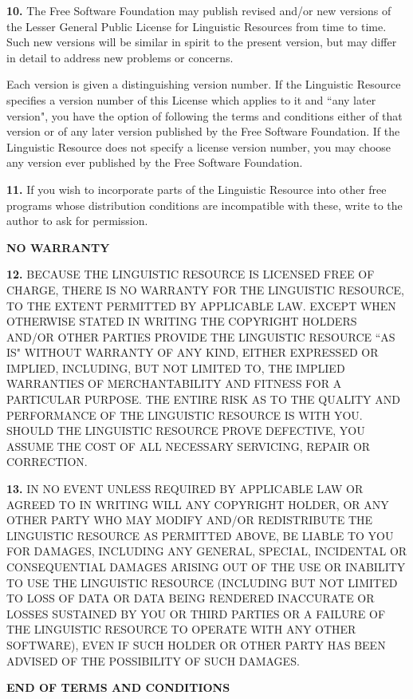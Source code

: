 \documentclass[10pt]{article}
\begin{document}
\vspace{5pt}\noindent
{\bf 10.} The Free Software 
      Foundation may publish revised and/or new versions of the Lesser General 
      Public License for Linguistic Resources from time to time. Such new 
      versions will be similar in spirit to the present version, but may differ 
      in detail to address new problems or concerns.

\vspace{5pt}\noindent
Each 
      version is given a distinguishing version number. If the Linguistic 
      Resource specifies a version number of this License which applies to it 
      and ``any later version", you have the option of following the terms and 
      conditions either of that version or of any later version published by the 
      Free Software Foundation. If the Linguistic Resource does not specify a 
      license version number, you may choose any version ever published by the 
      Free Software Foundation. 

\vspace{5pt}\noindent
{\bf 11.} If you wish to incorporate 
      parts of the Linguistic Resource into other free programs whose 
      distribution conditions are incompatible with these, write to the author 
      to ask for permission. 
\begin{center}{\bf NO WARRANTY}\end{center}
 
\vspace{5pt}\noindent
{\bf 12.} BECAUSE THE LINGUISTIC 
      RESOURCE IS LICENSED FREE OF CHARGE, THERE IS NO WARRANTY FOR THE LINGUISTIC RESOURCE, TO THE EXTENT PERMITTED BY APPLICABLE LAW. EXCEPT WHEN OTHERWISE STATED IN WRITING THE COPYRIGHT HOLDERS AND/OR OTHER PARTIES PROVIDE THE LINGUISTIC RESOURCE ``AS IS" WITHOUT WARRANTY OF ANY KIND, EITHER EXPRESSED OR IMPLIED, INCLUDING, BUT NOT LIMITED TO, THE IMPLIED WARRANTIES OF MERCHANTABILITY AND FITNESS FOR A PARTICULAR PURPOSE. THE ENTIRE RISK AS TO THE QUALITY AND PERFORMANCE OF THE LINGUISTIC RESOURCE IS WITH YOU. SHOULD THE LINGUISTIC RESOURCE PROVE DEFECTIVE, YOU ASSUME THE COST OF ALL NECESSARY SERVICING, REPAIR OR CORRECTION. 

\vspace{5pt}\noindent
{\bf 13.} IN NO EVENT UNLESS REQUIRED BY APPLICABLE LAW OR AGREED TO IN WRITING WILL ANY COPYRIGHT HOLDER, OR ANY OTHER PARTY WHO MAY MODIFY AND/OR REDISTRIBUTE THE LINGUISTIC RESOURCE AS PERMITTED ABOVE, BE LIABLE TO YOU FOR DAMAGES, INCLUDING ANY GENERAL, SPECIAL, INCIDENTAL OR CONSEQUENTIAL DAMAGES ARISING OUT OF THE USE OR INABILITY TO USE THE LINGUISTIC RESOURCE (INCLUDING BUT NOT LIMITED TO LOSS OF DATA OR DATA BEING RENDERED INACCURATE OR LOSSES SUSTAINED BY YOU OR THIRD PARTIES OR A FAILURE OF THE LINGUISTIC RESOURCE TO OPERATE WITH ANY OTHER SOFTWARE), EVEN IF SUCH HOLDER OR OTHER PARTY HAS BEEN ADVISED OF THE POSSIBILITY OF SUCH DAMAGES. 
\begin{center}{\bf \LARGE END OF TERMS AND CONDITIONS}\end{center}
\end{document}
